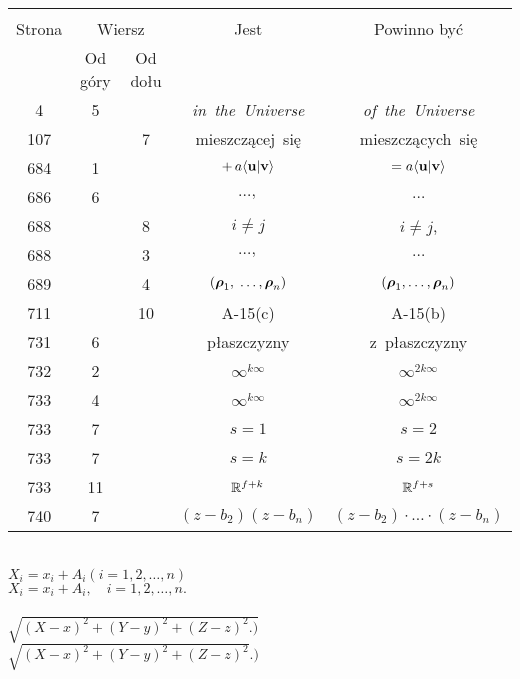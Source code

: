 \documentclass[a4paper,11pt]{article}
\begin{document}
\begin{center}

  \begin{tabular}{|c|c|c|c|c|}
    \hline
    & \multicolumn{2}{c|}{} & & \\
    Strona & \multicolumn{2}{c|}{Wiersz} & Jest
                              & Powinno być \\ \cline{2-3}
    & Od góry & Od dołu & & \\
    \hline
    4   &  5 & & \textit{in~the~Universe} & \textit{of~the~Universe} \\
    107 & &  7 & mieszczącej~się & mieszczących~się \\
    684 &  1 & & $+\, a \langle \mathbf{u} | \mathbf{v} \rangle$
           & $= a \langle \mathbf{u} | \mathbf{v} \rangle$ \\
    686 &  6 & & $\ldots,$ & $\ldots$ \\
    688 & &  8 & $i \neq j$ & $i \neq j$, \\
    688 & &  3 & $\ldots,$ & $\ldots$ \\
    689 & &  4 & $( \boldsymbol{\rho}_{ 1 },\; \ldots, \boldsymbol{\rho}_{ n } )$
           & $( \boldsymbol{\rho}_{ 1 }, \ldots, \boldsymbol{\rho}_{ n } )$ \\
    711 & & 10 & A-15(c) & A-15(b) \\
    731 &  6 & & płaszczyzny & z~płaszczyzny \\
    732 &  2 & & $\infty^{ k \infty }$ & $\infty^{ 2 k \infty }$ \\
    733 &  4 & & $\infty^{ k \infty }$ & $\infty^{ 2 k \infty }$ \\
    733 &  7 & & $s = 1$ & $s = 2$ \\
    733 &  7 & & $s = k$ & $s = 2k$ \\
    733 & 11 & & $\mathbb{R}^{ f + k }$ & $\mathbb{R}^{ f + s }$ \\
    740 &  7 & & $( z - b_{ 2 } )( z - b_{ n } )$
           & $( z - b_{ 2 } ) \cdot \ldots \cdot ( z - b_{ n } )$ \\
    \hline
  \end{tabular}

\end{center}


\noindent
{} \\
\Jest $X_{ i } = x_{ i } + A_{ i } ( i = 1, 2, \ldots, n )$ \\
\Powin $X_{ i } = x_{ i } + A_{ i }, \quad i = 1, 2, \ldots, n.$ \\
 \\[0.2em]
\Jest $\sqrt{ ( X - x )^{ 2 } + ( Y - y )^{ 2 } + ( Z - z )^{ 2 } .) }$
\\[0.4em]
\Powin $\sqrt{ ( X - x )^{ 2 } + ( Y - y )^{ 2 } + ( Z - z )^{ 2 } }.)$
\end{document}
